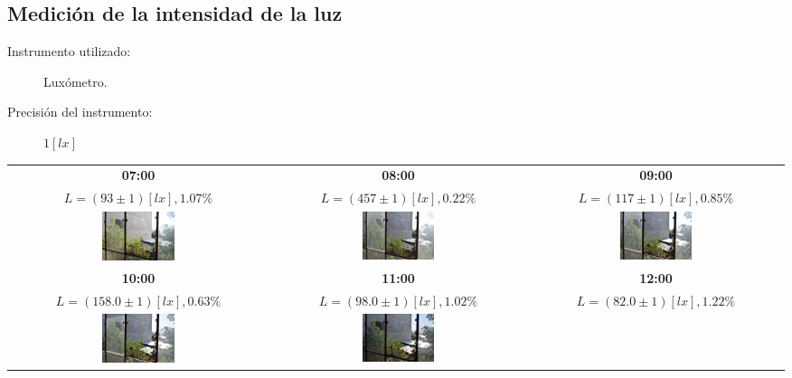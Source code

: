 \documentclass[letter,11pt]{article}
\begin{document}
\subsection{Medición de la intensidad de la luz}

\begin{description}
\item[Instrumento utilizado:] Luxómetro.
\item[Precisión del instrumento:] $1 [lx]$
\end{description}

\begin{tabular}{|c|c|c|}
\hline
\textbf{07:00} & \textbf{08:00} & \textbf{09:00} \tabularnewline
$L=(93\pm1)[lx], 1.07\%$ &
$L=(457\pm1)[lx], 0.22\%$ &
$L=(117\pm1)[lx], 0.85\%$ \tabularnewline
\includegraphics[width=0.293\textwidth]{img/01.luxometro.07.eps} &
\includegraphics[width=0.293\textwidth]{img/01.luxometro.08.eps} &
\includegraphics[width=0.293\textwidth]{img/01.luxometro.09.eps}
\tabularnewline \hline
\textbf{10:00} & \textbf{11:00} & \textbf{12:00} \tabularnewline
$L=(158.0\pm1)[lx], 0.63\%$ &
$L=(98.0\pm1)[lx], 1.02\%$ &
$L=(82.0\pm1)[lx], 1.22\%$ \tabularnewline
\includegraphics[width=0.293\textwidth]{img/01.luxometro.10.eps} &
\includegraphics[width=0.293\textwidth]{img/01.luxometro.11.eps} &

\end{tabular}
\end{document}
